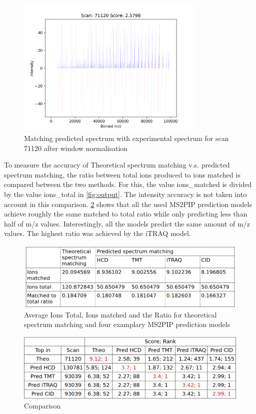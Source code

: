 \documentclass[11pt]{article}
\begin{document}
\begin{figure}[ht]
\centering
\includegraphics[width=0.8\textwidth]{figs/scan_71120_ps=True_wins.png}
\caption{Matching predicted spectrum with experimental spectrum for scan 71120 after window normalisation}
\label{fig:scanwin}
\end{figure}

To measure the accuracy of Theoretical spectrum matching v.s. predicted spectrum matching, the ratio between total ions produced to ions matched is compared between the two methods. For this, the value ions\_matched is divided by the value ions\_total in \cref{fig:output}. The intensity accuracy is not taken into account in this comparison. \cref{fig:ratio_table} shows that all the used MS2PIP prediction models achieve roughly the same matched to total ratio while only predicting less than half of m/z values. Interestingly, all the models predict the same amount of m/z values. The highest ratio was achieved by the iTRAQ model.

\begin{figure}[ht]
\centering
\includegraphics[width=1\textwidth]{figs/ratio_table.png}
\caption{Average Ions Total, Ions matched and the Ratio for theoretical spectrum matching and four examplary MS2PIP prediction models}
\label{fig:ratio_table}
\end{figure}

\begin{figure}[ht]
\centering
\includegraphics[width=1\textwidth]{figs/ident-comparison.png}
\caption{Comparison}
\label{fig:ident-comparison}
\end{figure}
\end{document}

